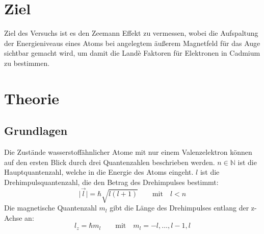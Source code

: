 \section*{Ziel}
    Ziel des Versuchs ist es den Zeemann Effekt zu vermessen, wobei die Aufspaltung der Energieniveaus eines Atoms bei angelegtem äußerem Magnetfeld für das Auge sichtbar gemacht wird, um damit die Landè Faktoren für Elektronen in Cadmium zu bestimmen.

\section{Theorie}
\label{sec:theorie}

    \subsection{Grundlagen}
    \label{sec:energie} 
        Die Zustände wasserstoffähnlicher Atome mit nur einem Valenzelektron können auf den ersten Blick durch drei Quantenzahlen beschrieben werden.
        $n \in \mathbb{N}$ ist die Hauptquantenzahl, welche in die Energie des Atoms eingeht.
        $l$ ist die Drehimpulsquantenzahl, die den Betrag des Drehimpulses bestimmt:
        \begin{equation}
            \vert \vec{l} \vert = \hbar \sqrt{l \left(l + 1 \right)} \qquad \text{mit} \quad l < n
        \end{equation}
        Die magnetische Quantenzahl $m_l$ gibt die Länge des Drehimpulses entlang der z-Achse an:
        \begin{equation}
            l_z = \hbar m_l \qquad \text{mit} \quad m_l = -l, \ldots, l-1, l
        \end{equation}


